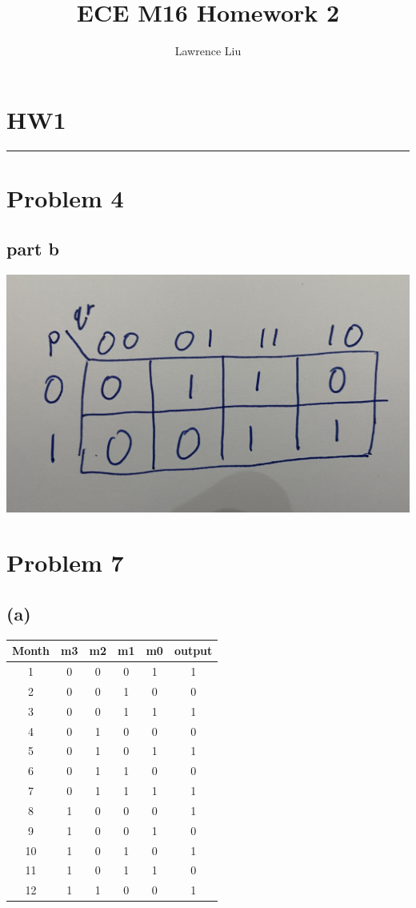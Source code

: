 \documentclass[12pt]{article}
\title{ECE M16 Homework 2}
\author{Lawrence Liu}
\begin{document}
\maketitle
\section*{HW1}
\noindent\rule{15cm}{1pt}
\section*{Problem  4}
\subsection*{part b}
\includegraphics[scale=0.15]{../HW1/Kmap.jpg}
\section*{Problem 7}
\subsection*{(a)}
\begin{center}
    \begin{tabular}{|c|c|c|c|c|c|}
        Month & m3 & m2 & m1 & m0 & output \\
        \hline
        1 & 0 & 0 & 0 & 1 & 1 \\
        \hline
        2 & 0 & 0 & 1 & 0 & 0 \\
        \hline
        3 & 0 & 0 & 1 & 1 & 1 \\
        \hline
        4 & 0 & 1 & 0 & 0 & 0 \\
        \hline
        5 & 0 & 1 & 0 & 1 & 1 \\
        \hline
        6 & 0 & 1 & 1 & 0 & 0 \\
        \hline
        7 & 0 & 1 & 1 & 1 & 1 \\
        \hline
        8 & 1 & 0 & 0 & 0 & 1 \\
        \hline
        9 & 1 & 0 & 0 & 1 & 0 \\
        \hline
        10 & 1 & 0 & 1 & 0 & 1 \\
        \hline
        11 & 1 & 0 & 1 & 1 & 0 \\
        \hline
        12 & 1 & 1 & 0 & 0 & 1 \\
        \hline
    \end{tabular}
\end{center}
\end{document}
